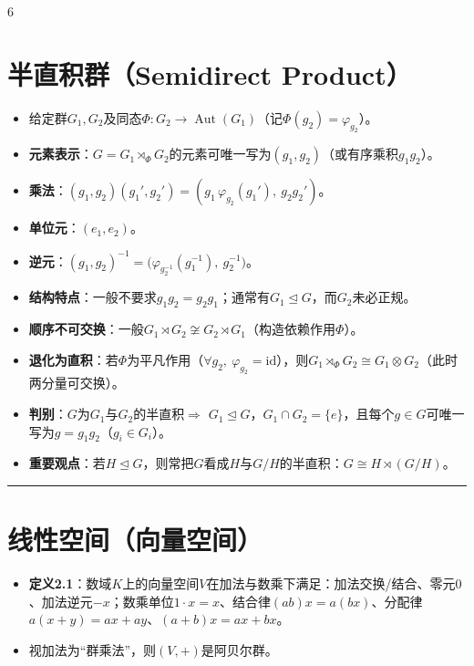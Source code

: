 \documentclass[landscape]{article}
\begin{document}
\begin{multicols*}{6}
\section*{半直积群（Semidirect Product）}
\begin{itemize}
  \item 给定群$G_1,G_2$及同态$\Phi:G_2\to \operatorname{Aut}(G_1)$（记$\Phi(g_2)=\varphi_{g_2}$）。
  \item \textbf{元素表示}：$G=G_1\rtimes_\Phi G_2$的元素可唯一写为$(g_1,g_2)$（或有序乘积$g_1g_2$）。
  \item \textbf{乘法}：$(g_1,g_2)(g_1',g_2')=(g_1\,\varphi_{g_2}(g_1'),\ g_2g_2')$。
  \item \textbf{单位元}：$(e_1,e_2)$。
  \item \textbf{逆元}：$(g_1,g_2)^{-1}=\big(\varphi_{g_2^{-1}}(g_1^{-1}),\ g_2^{-1}\big)$。
  \item \textbf{结构特点}：一般不要求$g_1g_2=g_2g_1$；通常有$G_1\trianglelefteq G$，而$G_2$未必正规。
  \item \textbf{顺序不可交换}：一般$G_1\rtimes G_2 \not\cong G_2\rtimes G_1$（构造依赖作用$\Phi$）。
  \item \textbf{退化为直积}：若$\Phi$为平凡作用（$\forall g_2,\ \varphi_{g_2}=\mathrm{id}$），则$G_1\rtimes_\Phi G_2 \cong G_1\otimes G_2$（此时两分量可交换）。
  \item \textbf{判别}：$G$为$G_1$与$G_2$的半直积$\Rightarrow$ $G_1\trianglelefteq G$，$G_1\cap G_2=\{e\}$，且每个$g\in G$可唯一写为$g=g_1g_2$（$g_i\in G_i$）。
  \item \textbf{重要观点}：若$H\trianglelefteq G$，则常把$G$看成$H$与$G/H$的半直积：$G\cong H\rtimes (G/H)$。
\end{itemize}
\noindent\textcolor{red}{\rule{\linewidth}{1pt}}
\section*{线性空间（向量空间）}
\begin{itemize}
  \item \textbf{定义2.1}：数域$K$上的向量空间$V$在加法与数乘下满足：加法交换/结合、零元$0$、加法逆元$-x$；数乘单位$1\cdot x=x$、结合律$(ab)x=a(bx)$、分配律$a(x+y)=ax+ay$、$(a+b)x=ax+bx$。
  \item 视加法为“群乘法”，则$(V,+)$是阿贝尔群。
\end{itemize}


\end{multicols*}
\end{document}
